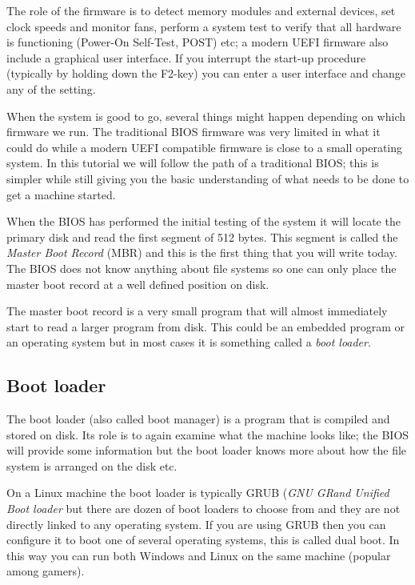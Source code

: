 \documentclass[a4paper,11pt]{article}
\begin{document}
The role of the firmware is to detect memory modules and external
devices, set clock speeds and monitor fans, perform a system test to
verify that all hardware is functioning (Power-On Self-Test, POST)
etc; a modern UEFI firmware also include a graphical user interface.
If you interrupt the start-up procedure (typically by holding down the
F2-key) you can enter a user interface and change any of the setting.

When the system is good to go, several things might happen depending on
which firmware we run. The traditional BIOS firmware was very limited
in what it could do while a modern UEFI compatible firmware is close to
a small operating system. In this tutorial we will follow the path of
a traditional BIOS; this is simpler while still giving you the basic understanding
of what needs to be done to get a machine started. 

When the BIOS has performed the initial testing of the system it will
locate the primary disk and read the first segment of 512 bytes. This
segment is called the {\em Master Boot Record} (MBR) and this is the
first thing that you will write today. The BIOS does not know anything
about file systems so one can only place the master boot record at a
well defined position on disk.

The master boot record is a very small program that will almost
immediately start to read a larger program from disk. This could be an
embedded program or an operating system but in most cases it is
something called a {\em boot loader}.

\subsection{Boot loader}

The boot loader (also called boot manager) is a program that is
compiled and stored on disk. Its role is to again examine what the
machine looks like; the BIOS will provide some information but the
boot loader knows more about how the file system is arranged on the
disk etc.

On a Linux machine the boot loader is typically GRUB ({\em GNU GRand
  Unified Boot loader} but there are dozen of boot loaders to choose
from and they are not directly linked to any operating system. If you
are using GRUB then you can configure it to boot one of several
operating systems, this is called dual boot. In this way you can run
both Windows and Linux on the same machine (popular among gamers).
\end{document}
